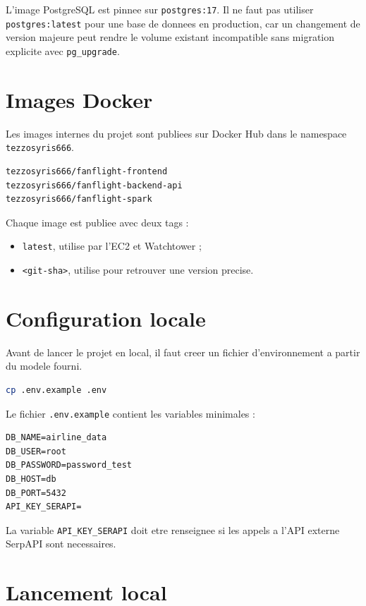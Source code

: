 \documentclass[12pt,a4paper]{article}
\begin{document}
L'image PostgreSQL est pinnee sur \texttt{postgres:17}. Il ne faut pas utiliser \texttt{postgres:latest} pour une base de donnees en production, car un changement de version majeure peut rendre le volume existant incompatible sans migration explicite avec \texttt{pg\_upgrade}.

\section{Images Docker}

Les images internes du projet sont publiees sur Docker Hub dans le namespace \texttt{tezzosyris666}.

\begin{lstlisting}
tezzosyris666/fanflight-frontend
tezzosyris666/fanflight-backend-api
tezzosyris666/fanflight-spark
\end{lstlisting}

Chaque image est publiee avec deux tags :

\begin{itemize}
  \item \texttt{latest}, utilise par l'EC2 et Watchtower ;
  \item \texttt{<git-sha>}, utilise pour retrouver une version precise.
\end{itemize}

\section{Configuration locale}

Avant de lancer le projet en local, il faut creer un fichier d'environnement a partir du modele fourni.

\begin{lstlisting}[language=bash]
cp .env.example .env
\end{lstlisting}

Le fichier \texttt{.env.example} contient les variables minimales :

\begin{lstlisting}
DB_NAME=airline_data
DB_USER=root
DB_PASSWORD=password_test
DB_HOST=db
DB_PORT=5432
API_KEY_SERAPI=
\end{lstlisting}

La variable \texttt{API\_KEY\_SERAPI} doit etre renseignee si les appels a l'API externe SerpAPI sont necessaires.

\section{Lancement local}
\end{document}
